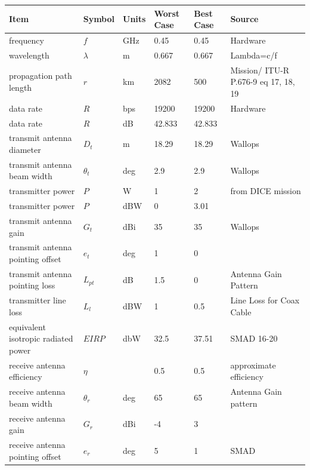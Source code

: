 \documentclass[12pt]{article}
\begin{document}
\begin{center}
\begin{longtable}{| p{3.9cm} | p{1.6cm} | p{1.4cm} | p{1.4cm} | p{1.4cm} | p{5cm} |}
\hline
    \textbf{Item}  & \textbf{Symbol} & \textbf{Units}  & \textbf{Worst Case} & \textbf{Best Case} & \textbf{Source}  \\
    \hline \hline
    frequency & $f$     & GHz   & 0.45  & 0.45  & Hardware \\ \hline
    wavelength & $\lambda$ & m     & 0.667 & 0.667 & Lambda=c/f \\ \hline
    propagation path length & $r$     & km    & 2082  & 500   & Mission/ ITU-R P.676-9 eq 17, 18, 19 \\\hline
    data rate & $R$     & bps   & 19200 & 19200 & Hardware \\\hline
    data rate & $R$     & dB    & 42.833 & 42.833 &  \\\hline
    transmit antenna diameter & $D_t$  & m     & 18.29 & 18.29 & Wallops \\\hline
    transmit antenna beam width & $\theta_t$ & deg   & 2.9   & 2.9   & Wallops \\\hline
    transmitter power & $P$     & W     & 1     & 2     & from DICE mission \\\hline
    transmitter power & $P$     & dBW   & 0     & 3.01  &  \\\hline
    transmit antenna gain & $G_t$  & dBi   & 35    & 35    & Wallops \\\hline
    transmit antenna pointing offset & $e_t$  & deg   & 1     & 0     &  \\\hline
    transmit antenna pointing loss & $L_{pt}$ & dB    & 1.5   & 0     & Antenna Gain Pattern \\\hline
    transmitter line loss & $L_l$  & dBW   & 1     & 0.5   & Line Loss for Coax Cable \cite{loss-calc} \\\hline
    equivalent isotropic radiated power & $EIRP$  & dbW   & 32.5  & 37.51 & SMAD 16-20 \\\hline
    receive antenna efficiency & $\eta$   &       & 0.5   & 0.5   & approximate efficiency \\\hline
    receive antenna beam width & $\theta_r$ & deg   & 65    & 65    & Antenna Gain pattern \\\hline
    receive antenna gain & $G_r$  & dBi   & -4    & 3     &  \\\hline
    receive antenna pointing offset & $e_r$  & deg   & 5     & 1     & SMAD \\\hline

\end{longtable}
\end{center}
\end{document}
